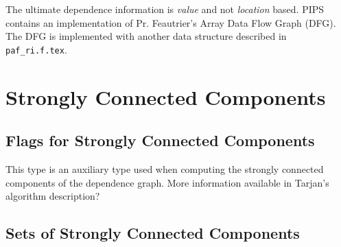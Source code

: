 \documentclass[a4paper]{article}
\begin{document}
The ultimate dependence information is {\em value} and not {\em
location} based. PIPS contains an implementation of Pr. Feautrier's
Array Data Flow Graph (DFG). The DFG is implemented with another data
structure described in \verb/paf_ri.f.tex/.

\begin{comment}
Le domaine co^ne de'finit une approximation polye'drique de l'ensemble
des de'pendances porte'es par un arc. Plusieurs types d'approximation
sont possibles: les niveaux de de'pendance, les vecteurs de direction de
de'pendance, les syste`mes ge'ne'rateurs (aussi
connus sous le nom de {\em co^ne de de'pendance}) et le me'canisme
du {\em Data Flow Graph} n'est pas imple'mente' avec cette structure
de donne'es mais avec \verb|paf_ri|.
\end{comment}

\begin{comment}
Le niveau d'une de'pendance d\'ecrivent le nombre de boucles englobantes
concerne\'ees.  ``{generating\_system}'' est la r\'epresentation de
system generateur.
\end{comment}

\section{Strongly Connected Components}
\label{section-strongly-connected-components}

\subsection{Flags for Strongly Connected Components}

{}

This type is an auxiliary type used when computing the strongly
connected components of the dependence graph. More information
available in Tarjan's algorithm description?

\begin{comment}
Ce domaine est utilise' par l'algorithme de calcul des composantes
fortement connexes d'un graphe.
\end{comment}

\subsection{Sets of Strongly Connected Components}

{}
\end{document}
